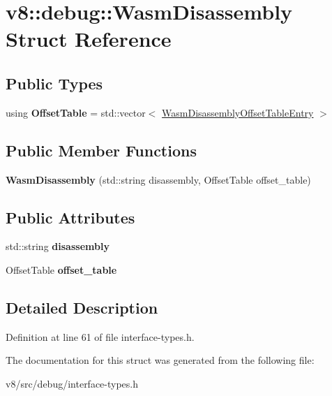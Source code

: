 \hypertarget{structv8_1_1debug_1_1WasmDisassembly}{}\section{v8\+:\+:debug\+:\+:Wasm\+Disassembly Struct Reference}
\label{structv8_1_1debug_1_1WasmDisassembly}
\subsection*{Public Types}
\begin{DoxyCompactItemize}
\item 
\mbox{\label{structv8_1_1debug_1_1WasmDisassembly_a06ea6dc9bdafae8282dbfe9569990f9b}} 
using {\bfseries Offset\+Table} = std\+::vector$<$ \mbox{\hyperlink{structv8_1_1debug_1_1WasmDisassemblyOffsetTableEntry}{Wasm\+Disassembly\+Offset\+Table\+Entry}} $>$
\end{DoxyCompactItemize}
\subsection*{Public Member Functions}
\begin{DoxyCompactItemize}
\item 
\mbox{\label{structv8_1_1debug_1_1WasmDisassembly_a5681d60f4fdfd90a1efd305b9adbecb6}} 
{\bfseries Wasm\+Disassembly} (std\+::string disassembly, Offset\+Table offset\+\_\+table)
\end{DoxyCompactItemize}
\subsection*{Public Attributes}
\begin{DoxyCompactItemize}
\item 
\mbox{\label{structv8_1_1debug_1_1WasmDisassembly_ad278a0b839190ba8aa6f12d7fca4ca6b}} 
std\+::string {\bfseries disassembly}
\item 
\mbox{\label{structv8_1_1debug_1_1WasmDisassembly_abdb7bbe148ed11514fd8c2938876f01d}} 
Offset\+Table {\bfseries offset\+\_\+table}
\end{DoxyCompactItemize}


\subsection{Detailed Description}


Definition at line 61 of file interface-\/types.\+h.



The documentation for this struct was generated from the following file\+:\begin{DoxyCompactItemize}
\item 
v8/src/debug/interface-\/types.\+h\end{DoxyCompactItemize}
